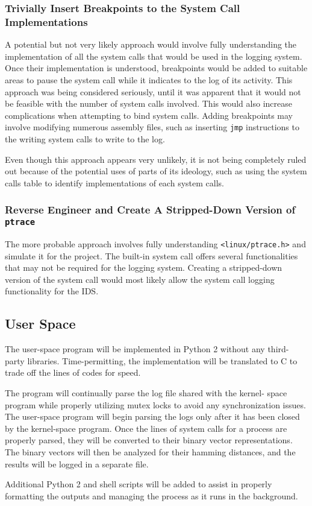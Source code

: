 \documentclass[paper=usletter, fontsize=12pt]{article}
\begin{document}
    \subsubsection{Trivially Insert Breakpoints to the System Call
    Implementations} A potential but not very likely approach would involve
    fully understanding the implementation of all the system calls that would
    be used in the logging system. Once their implementation is understood,
    breakpoints would be added to suitable areas to pause the system call while
    it indicates to the log of its activity. This approach was being considered
    seriously, until it was apparent that it would not be feasible with the
    number of system calls involved. This would also increase complications
    when attempting to bind system calls. Adding breakpoints may involve
    modifying numerous assembly files, such as inserting \texttt{jmp}
    instructions to the writing system calls to write to the log.

    Even though this approach appears very unlikely, it is not being completely
    ruled out because of the potential uses of parts of its ideology, such as
    using the system calls table to identify implementations of each system
    calls.

    \subsubsection{Reverse Engineer and Create A Stripped-Down Version of
    \texttt{ptrace}} The more probable approach involves fully understanding
    \texttt{<linux/ptrace.h>} and simulate it for the project. The built-in
    system call offers several functionalities that may not be required for the
    logging system. Creating a stripped-down version of the system call would
    most likely allow the system call logging functionality for the IDS.

    \subsection{User Space} The user-space program will be implemented in
    Python 2 without any third-party libraries. Time-permitting, the
    implementation will be translated to C to trade off the lines of codes for
    speed.

    The program will continually parse the log file shared with the kernel-
    space program while properly utilizing mutex locks to avoid any
    synchronization issues. The user-space program will begin parsing the logs
    only after it has been closed by the kernel-space program. Once the lines
    of system calls for a process are properly parsed, they will be converted
    to their binary vector representations. The binary vectors will then be
    analyzed for their hamming distances, and the results will be logged in a
    separate file.

    Additional Python 2 and shell scripts will be added to assist in properly
    formatting the outputs and managing the process as it runs in the
    background.
\end{document}

